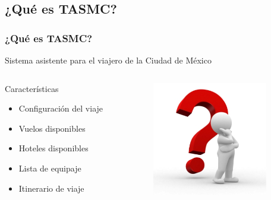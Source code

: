 \documentclass[12pt]{beamer}
\begin{document}
\subsection{¿Qué es TASMC?}
\begin{frame}[c]
	\frametitle{¿Qué es TASMC?}
	\begin{block}{}
		Sistema asistente para el viajero de la Ciudad de México
	\end{block}
	\begin{columns} 
		\begin{column}{5cm}
			\begin{block}{Características} \small 
				\begin{itemize}
					\item Configuración del viaje
					\item Vuelos disponibles
					\item Hoteles disponibles
					\item Lista de equipaje
					\item Itinerario de viaje
				\end{itemize} 
			\end{block} 
		\end{column}
		\begin{column}{4cm} 
			\begin{center}
				\includegraphics[height=5cm]{imagenes/queEs.jpg}
			\end{center} 
		\end{column} 
	\end{columns}
\end{frame}
\end{document}
